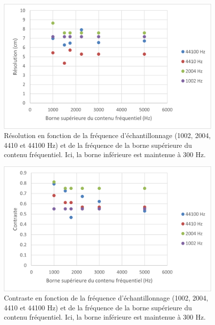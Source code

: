 ﻿\documentclass[11pt,letterpaper]{article}
\begin{document}
\begin{figure}[H]
    \centering
    \includegraphics[scale=0.8]{resolution_interdependance.png}
    \caption{Résolution en fonction de la fréquence d'échantillonnage
    (1002, 2004, 4410 et 44100 Hz) et de la fréquence de la borne supérieure du contenu fréquentiel.
    Ici, la borne inférieure est maintenue à 300 Hz.}
    \label{res_interdep}
\end{figure}
\begin{figure}[H]
    \centering
    \includegraphics[scale=0.8]{contraste_interdependance.png}
    \caption{Contraste en fonction de la fréquence d'échantillonnage
    (1002, 2004, 4410 et 44100 Hz) et de la fréquence de la borne supérieure du contenu fréquentiel.
    Ici, la borne inférieure est maintenue à 300 Hz.}
    \label{contraste_interdep}
\end{figure}
\end{document}
